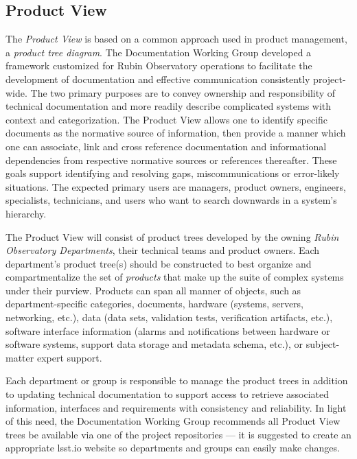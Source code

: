 \subsection{Product View}

The \emph{Product View} is based on a common approach used in product management, a \emph{product tree diagram}.
The Documentation Working Group developed a framework customized for Rubin Observatory operations to facilitate the development of documentation and effective communication consistently project-wide.
The two primary purposes are to convey ownership and responsibility of technical documentation and more readily describe complicated systems with context and categorization.
The Product View allows one to identify specific documents as the normative source of information, then provide a manner which one can associate, link and cross reference documentation and informational dependencies from respective normative sources or references thereafter.
These goals support identifying and resolving gaps, miscommunications or error-likely situations.
The expected primary users are managers, product owners, engineers, specialists, technicians, and users who want to search downwards in a system's hierarchy.


The Product View will consist of product trees developed by the owning \emph{Rubin Observatory Departments}, their technical teams and product owners.
Each department's product tree(s) should be constructed to best organize and compartmentalize the set of \emph{products} that make up the suite of complex systems under their purview.
Products can span all manner of objects, such as department-specific categories, documents, hardware (systems, servers, networking, etc.), data (data sets, validation tests, verification artifacts, etc.), software interface information (alarms and notifications between hardware or software systems, support data storage and metadata schema, etc.), or subject-matter expert support.


Each department or group is responsible to manage the product trees in addition to updating technical documentation to support access to retrieve associated information, interfaces and requirements with consistency and reliability.
In light of this need, the Documentation Working Group recommends all Product View trees be available via one of the project repositories --- it is suggested to create an appropriate lsst.io website so departments and groups can easily make changes.

